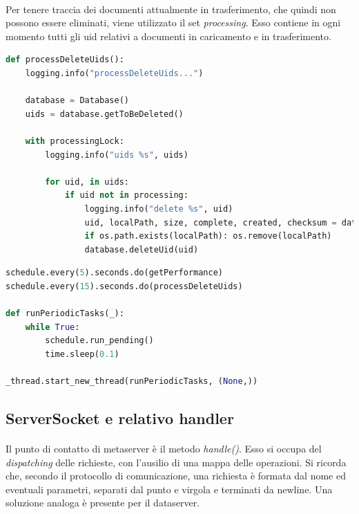 \documentclass{article}
\begin{document}
\paragraph{} Per tenere traccia dei documenti attualmente in trasferimento, che quindi non possono essere eliminati, viene utilizzato il set \emph{processing}. Esso contiene in ogni momento tutti gli uid relativi a documenti in caricamento e in trasferimento. 

\begin{lstlisting}[language=Python, title=Eliminazione dei documenti in coda]
def processDeleteUids():
    logging.info("processDeleteUids...")

    database = Database()
    uids = database.getToBeDeleted()

    with processingLock:
        logging.info("uids %s", uids)

        for uid, in uids:
            if uid not in processing:
                logging.info("delete %s", uid)
                uid, localPath, size, complete, created, checksum = database.getObject(uid)
                if os.path.exists(localPath): os.remove(localPath)
                database.deleteUid(uid)
\end{lstlisting}

\begin{lstlisting}[language=Python, title=Scheduling ed esecuzione]
schedule.every(5).seconds.do(getPerformance)
schedule.every(15).seconds.do(processDeleteUids)

def runPeriodicTasks(_):
    while True:
        schedule.run_pending()
        time.sleep(0.1)

_thread.start_new_thread(runPeriodicTasks, (None,))
\end{lstlisting}


\subsection{ServerSocket e relativo handler}

\paragraph{} Il punto di contatto di metaserver è il metodo \emph{handle()}. Esso si occupa del \emph{dispatching} delle richieste, con l'ausilio di una mappa delle operazioni. Si ricorda che, secondo il protocollo di comunicazione, una richiesta è formata dal nome ed eventuali parametri, separati dal punto e virgola e terminati da newline. Una soluzione analoga è presente per il dataserver.
\end{document}
